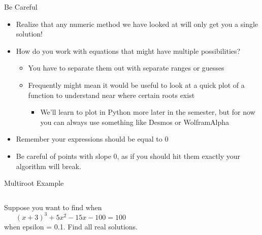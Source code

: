 \documentclass[pdf, aspectratio=169, 12pt]{beamer}
\begin{document}
\begin{frame}{Be Careful}
	\begin{itemize}
		\item Realize that any numeric method we have looked at will only get you a \alert{single} solution!
		\item How do you work with equations that might have multiple possibilities?
			\begin{itemize}
				\item You have to separate them out with separate ranges or guesses
				\item Frequently might mean it would be useful to look at a quick plot of a function to understand near where certain roots exist
					\begin{itemize}
						\item We'll learn to plot in Python more later in the semester, but for now you can always use something like Desmos or WolframAlpha
					\end{itemize}
			\end{itemize}
		\item Remember your expressions should be equal to 0
		\item Be careful of points with slope 0, as if you should hit them exactly your algorithm will break.
	\end{itemize}
\end{frame}

\begin{frame}{Multiroot Example}
	\begin{columns}
		\begin{example}
			Suppose you want to find when
			\[(x+3)^3 +5x^2 - 15x - 100 = 100\]
			when epsilon = 0.1. Find all real solutions.
		\end{example}
		\begin{center}
		\end{center}
	\end{columns}
\end{frame}
\end{document}
